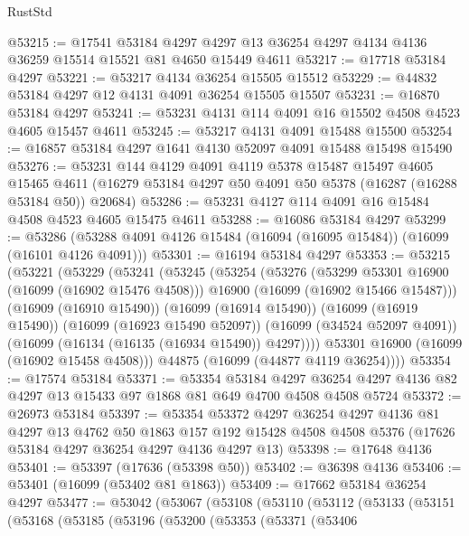 \begin{lexlean}{RustStd}
\begin{coremodule}
@53215 := @17541
    @53184
    @4297
    @4297
    @13
    @36254
    @4297
    @4134
    @4136
    @36259
    @15514
    @15521
    @81
    @4650
    @15449
    @4611
@53217 := @17718 @53184 @4297
@53221 := @53217 @4134 @36254 @15505 @15512
@53229 := @44832 @53184 @4297 @12 @4131 @4091 @36254 @15505 @15507
@53231 := @16870 @53184 @4297
@53241 := @53231 @4131 @114 @4091 @16 @15502 @4508 @4523 @4605 @15457 @4611
@53245 := @53217 @4131 @4091 @15488 @15500
@53254 := @16857 @53184 @4297 @1641 @4130 @52097 @4091 @15488 @15498 @15490
@53276 := @53231
    @144
    @4129
    @4091
    @4119
    @5378
    @15487
    @15497
    @4605
    @15465
    @4611
    (@16279 @53184 @4297 @50 @4091 @50 @5378 (@16287 (@16288 @53184 @50)) @20684)
@53286 := @53231 @4127 @114 @4091 @16 @15484 @4508 @4523 @4605 @15475 @4611
@53288 := @16086 @53184 @4297
@53299 := @53286 (@53288 @4091 @4126 @15484 (@16094 (@16095 @15484)) (@16099 (@16101 @4126 @4091)))
@53301 := @16194 @53184 @4297
@53353 := @53215
    (@53221
      (@53229
        (@53241
          (@53245
            (@53254
              (@53276
                (@53299 @53301 @16900 (@16099 (@16902 @15476 @4508)))
                @16900
                (@16099 (@16902 @15466 @15487)))
              (@16909 (@16910 @15490))
              (@16099 (@16914 @15490))
              (@16099 (@16919 @15490))
              (@16099 (@16923 @15490 @52097))
              (@16099 (@34524 @52097 @4091))
              (@16099 (@16134 (@16135 (@16934 @15490)) @4297))))
          @53301
          @16900
          (@16099 (@16902 @15458 @4508)))
        @44875
        (@16099 (@44877 @4119 @36254))))
@53354 := @17574 @53184
@53371 := @53354
    @53184
    @4297
    @36254
    @4297
    @4136
    @82
    @4297
    @13
    @15433
    @97
    @1868
    @81
    @649
    @4700
    @4508
    @4508
    @5724
@53372 := @26973 @53184
@53397 := @53354
    @53372
    @4297
    @36254
    @4297
    @4136
    @81
    @4297
    @13
    @4762
    @50
    @1863
    @157
    @192
    @15428
    @4508
    @4508
    @5376
    (@17626 @53184 @4297 @36254 @4297 @4136 @4297 @13)
@53398 := @17648 @4136
@53401 := @53397 (@17636 (@53398 @50))
@53402 := @36398 @4136
@53406 := @53401 (@16099 (@53402 @81 @1863))
@53409 := @17662 @53184 @36254 @4297
@53477 := @53042
    (@53067
      (@53108
        (@53110
          (@53112
            (@53133
              (@53151
                (@53168
                  (@53185
                    (@53196
                      (@53200
                        (@53353
                          (@53371
                            (@53406

\end{coremodule}
\end{lexlean}
